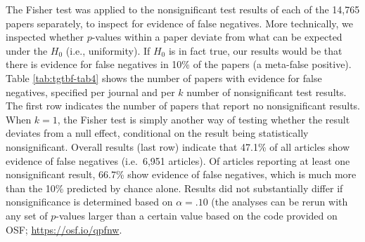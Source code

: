 \documentclass[a5paper]{book}
\begin{document}
The Fisher test was applied to the nonsignificant test results of each
of the 14,765 papers separately, to inspect for evidence of false
negatives. More technically, we inspected whether \(p\)-values within a
paper deviate from what can be expected under the \(H_0\) (i.e.,
uniformity). If \(H_0\) is in fact true, our results would be that there
is evidence for false negatives in 10\% of the papers (a meta-false
positive). Table \ref{tab:tgtbf-tab4} shows the number of papers with
evidence for false negatives, specified per journal and per \(k\) number
of nonsignificant test results. The first row indicates the number of
papers that report no nonsignificant results. When \(k=1\), the Fisher
test is simply another way of testing whether the result deviates from a
null effect, conditional on the result being statistically
nonsignificant. Overall results (last row) indicate that 47.1\% of all
articles show evidence of false negatives (i.e.~6,951 articles). Of
articles reporting at least one nonsignificant result, 66.7\% show
evidence of false negatives, which is much more than the 10\% predicted
by chance alone. Results did not substantially differ if nonsignificance
is determined based on \(\alpha=.10\) (the analyses can be rerun with
any set of \(p\)-values larger than a certain value based on the code
provided on OSF; \url{https://osf.io/qpfnw}.
\end{document}
